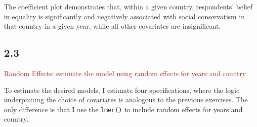 \documentclass[
]{article}
\begin{document}
The coefficient plot demonstrates that, within a given country,
respondents' belief in equality is significantly and negatively
associated with social conservatism in that country in a given year,
while all other covariates are insignificant.

\hypertarget{section-5}{%
\subsection{2.3}\label{section-5}}

\textcolor{brown}{Random Effects: estimate the model using random effects for years and country}

To estimate the desired models, I estimate four specifications, where
the logic underpinning the choice of covariates is analogous to the
previous exercises. The only difference is that I use the
\texttt{lmer()} to include random effects for years and country.
\end{document}
